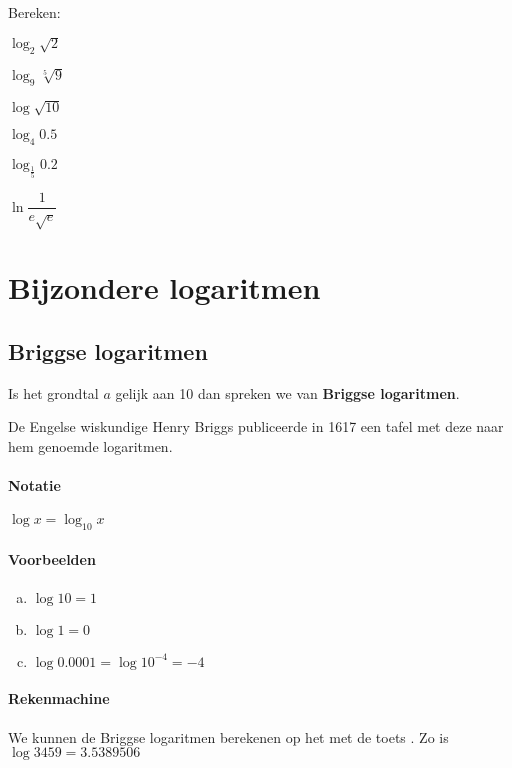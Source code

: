 \documentclass[12pt,twoside]{article}
\begin{document}
\begin{oefening}
Bereken:
\begin{exlist}{3}
  \item $\log_2 \sqrt{2}$
  \item $\log_9 \sqrt[5]{9}$
  \item $\log \sqrt{10}$
  \item $\log_4 0.5$
  \item $\log_{\frac{1}{5}} 0.2$
  \item $\ln \dfrac{1}{e\sqrt{e}}$
\end{exlist}
\end{oefening}

\pagebreak
\section{Bijzondere logaritmen}

\subsection{Briggse logaritmen}

Is het grondtal $a$ gelijk aan 10 dan spreken we van {\bf Briggse logaritmen}.

De Engelse wiskundige Henry Briggs publiceerde in 1617 een tafel met deze naar hem genoemde logaritmen.

\paragraph{Notatie} $\log x = \log_{10} x$

\paragraph{Voorbeelden}\begin{minipage}[t]{\textwidth}
\begin{enumerate}[(a)]
  \item $\log 10 = 1$
  \item $\log 1 = 0$
  \item $\log 0.0001 = \log 10^{-4} = -4$
\end{enumerate}
\end{minipage}

\paragraph{Rekenmachine} We kunnen de Briggse logaritmen berekenen op het  met de toets . Zo is $\log 3459 = 3.5389506$
\end{document}
